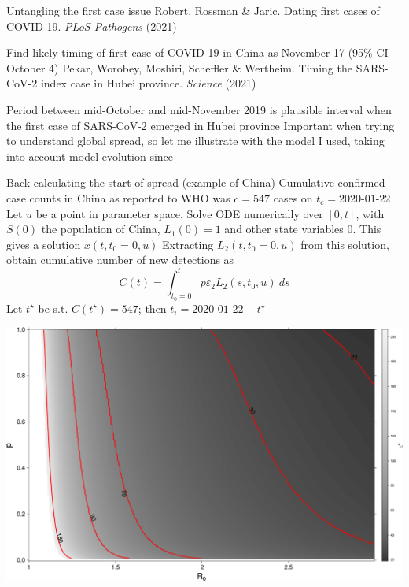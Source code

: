 \documentclass[aspectratio=169]{beamer}\usepackage[]{graphicx}\usepackage[]{xcolor}
\begin{document}
\begin{frame}{Untangling the first case issue}
\bbullet Robert, Rossman \& Jaric. Dating first cases of COVID-19. \emph{PLoS Pathogens} (2021)

Find likely timing of first case of COVID-19 in China as November 17 (95\% CI October 4)
\vfill
\bbullet Pekar, Worobey, Moshiri, Scheffler \& Wertheim. Timing the SARS-CoV-2 index case in Hubei province. \emph{Science} (2021)

Period between mid-October and mid-November 2019 is plausible interval when the first case of SARS-CoV-2 emerged in Hubei province
\vfill
Important when trying to understand global spread, so let me illustrate with the model I used, taking into account model evolution since
\end{frame}

\begin{frame}{Back-calculating the start of spread (example of China)}
Cumulative confirmed case counts in China as reported to WHO was $c=547$ cases on $t_c=\textrm{2020-01-22}$
\vfill
Let $u$ be a point in parameter space. Solve ODE numerically over $[0,t]$, with $S(0)$ the population of China, $L_1(0)=1$ and other state variables 0. This gives a solution $x(t,t_0=0,u)$
\vfill
Extracting $L_2(t,t_0=0,u)$ from this solution, obtain cumulative number of new detections as
\[
C(t) = \int_{t_0=0}^{t} p\varepsilon_2 L_2(s,t_0,u)\ ds
\]
\vfill
Let $t^\star$ be s.t. $C(t^\star)=547$; then $t_i=\textrm{2020-01-22}-t^\star$
\end{frame}

\begin{frame}
\centering
\includegraphics[width=\textwidth]{FIGS/start_time_vs_R0_and_p.png}
\end{frame}
\end{document}
